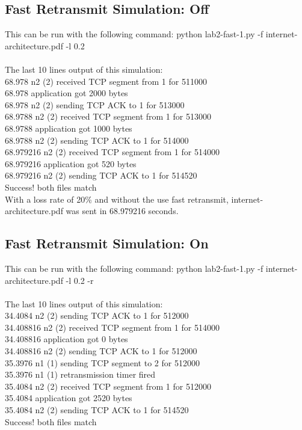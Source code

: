\documentclass[fleqn,11pt]{article}
\begin{document}
 \subsection{Fast Retransmit Simulation: Off}
This can be run with the following command: python lab2-fast-1.py -f internet-architecture.pdf -l 0.2\\\\
The last 10 lines output of this simulation:\\
68.978 n2 (2) received TCP segment from 1 for 511000\\
68.978 application got 2000 bytes\\
68.978 n2 (2) sending TCP ACK to 1 for 513000\\
68.9788 n2 (2) received TCP segment from 1 for 513000\\
68.9788 application got 1000 bytes\\
68.9788 n2 (2) sending TCP ACK to 1 for 514000\\
68.979216 n2 (2) received TCP segment from 1 for 514000\\
68.979216 application got 520 bytes\\
68.979216 n2 (2) sending TCP ACK to 1 for 514520\\
Success! both files match\\

With a loss rate of 20\% and without the use fast retransmit, internet-architecture.pdf was sent in 68.979216 seconds.

 \subsection{Fast Retransmit Simulation: On}
This can be run with the following command: python lab2-fast-1.py -f internet-architecture.pdf -l 0.2 -r\\\\
The last 10 lines output of this simulation:\\
34.4084 n2 (2) sending TCP ACK to 1 for 512000\\
34.408816 n2 (2) received TCP segment from 1 for 514000\\
34.408816 application got 0 bytes\\
34.408816 n2 (2) sending TCP ACK to 1 for 512000\\
35.3976 n1 (1) sending TCP segment to 2 for 512000\\
35.3976 n1 (1) retransmission timer fired\\
35.4084 n2 (2) received TCP segment from 1 for 512000\\
35.4084 application got 2520 bytes\\
35.4084 n2 (2) sending TCP ACK to 1 for 514520\\
Success! both files match\\
\end{document}
